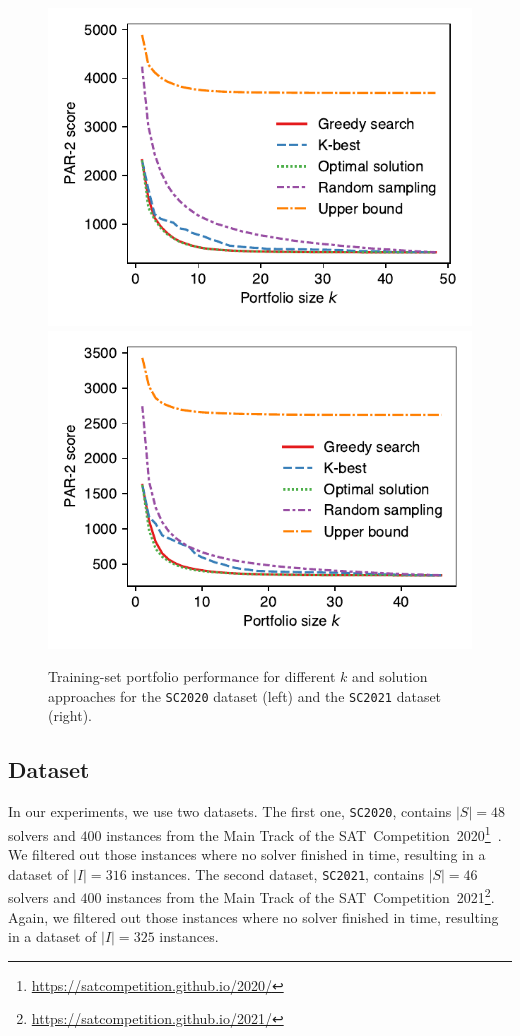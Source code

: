 \documentclass[conference]{IEEEtran}
\begin{document}
\begin{figure}[t]
	\centering
	\includegraphics[width=0.9\columnwidth]{plots/search-train-objective-2020.pdf}
	\qquad
	\includegraphics[width=0.9\columnwidth]{plots/search-train-objective-2021.pdf}
	\caption{Training-set portfolio performance for different $k$ and solution approaches for the \texttt{SC2020} dataset (left) and the \texttt{SC2021} dataset (right).}
	\label{fig:search-train-objective}
\end{figure}

\subsection{Dataset}

In our experiments, we use two datasets.
The first one, \texttt{SC2020}, contains $|S| = 48$ solvers and $400$ instances from the Main Track of the SAT~Competition~2020\footnote{\url{https://satcompetition.github.io/2020/}}~\cite{balyo2020proceedings, SC2020:AIJ}.
We filtered out those instances where no solver finished in time, resulting in a dataset of $|I| = 316$ instances. 
The second dataset, \texttt{SC2021}, contains $|S| = 46$ solvers and $400$ instances from the Main Track of the SAT~Competition~2021\footnote{\url{https://satcompetition.github.io/2021/}}.
Again, we filtered out those instances where no solver finished in time, resulting in a dataset of $|I| = 325$ instances.
\end{document}
